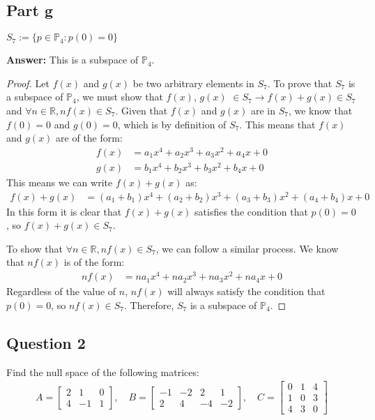 \documentclass{article}
\begin{document}
\subsection*{Part g}
$S_{7} := \{p \in \mathbb{P}_{4} : p(0) = 0\}$

\textbf{Answer:} This is a subspace of $\mathbb{P}_{4}$.

\begin{proof}
Let $f(x)$ and $g(x)$ be two arbitrary elements in $S_{7}$.
To prove that $S_{7}$ is a subspace of $\mathbb{P}_{4}$, we must show that $f(x)$, $g(x)$ $\in S_{7} \rightarrow f(x) + g(x) \in S_{7}$ and $\forall n \in \mathbb{R}, nf(x) \in S_{7}$.
Given that $f(x)$ and $g(x)$ are in $S_{7}$, we know that $f(0) = 0$ and $g(0) = 0$, which is by definition of $S_{7}$.
This means that $f(x)$ and $g(x)$ are of the form:
\begin{align*} 
    f(x) &= a_{1}x^4 + a_{2}x^3 + a_{3}x^2 + a_{4}x + 0 \\ 
    g(x) &= b_{1}x^4 + b_{2}x^3 + b_{3}x^2 + b_{4}x + 0
\end{align*}
This means we can write $f(x) + g(x)$ as:
\begin{align*} 
    f(x) + g(x) &= (a_{1} + b_{1})x^4 + (a_{2} + b_{2})x^3 + (a_{3} + b_{3})x^2 + (a_{4} + b_{4})x + 0
\end{align*}
In this form it is clear that $f(x) +g(x)$ satisfies the condition that $p(0) = 0$, so $f(x) + g(x) \in S_{7}$.

To show that $\forall n \in \mathbb{R}, nf(x) \in S_{7}$, we can follow a similar process.
We know that $nf(x)$ is of the form:
\begin{align*} 
    nf(x) &= na_{1}x^4 + na_{2}x^3 + na_{3}x^2 + na_{4}x + 0
\end{align*}
Regardless of the value of $n$, $nf(x)$ will always satisfy the condition that $p(0) = 0$, so $nf(x) \in S_{7}$.
Therefore, $S_{7}$ is a subspace of $\mathbb{P}_{4}$.
\end{proof}

\newpage
\subsection*{Question 2}
Find the null space of the following matrices:
\begin{align*}
A = \begin{bmatrix} 2 & 1 & 0 \\ 4 & -1 & 1 \end{bmatrix}, \quad
B = \begin{bmatrix} -1 & -2 & 2 & 1 \\ 2 & 4 & -4 & -2 \end{bmatrix}, \quad
C = \begin{bmatrix} 0 & 1 & 4 \\ 1 & 0 & 3 \\ 4 & 3 & 0 \end{bmatrix}
\end{align*}
\end{document}
